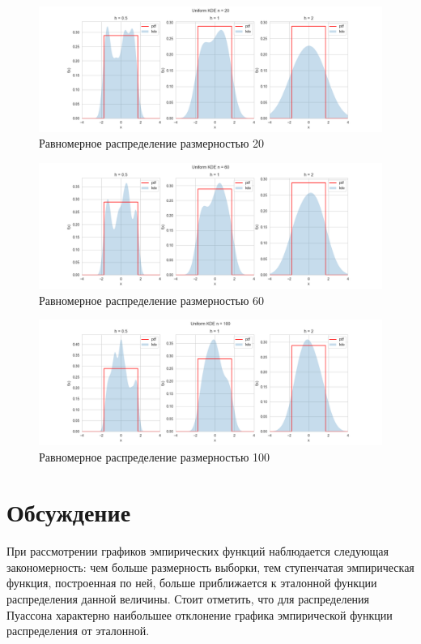 \documentclass[12pt,a4paper]{article}
\begin{document}
\begin{figure}[H]
    \centering
    \includegraphics[scale=0.5]{images/Uniform20.png}
    \caption{Равномерное распределение размерностью 20}
\end{figure}

\begin{figure}[H]
    \centering
    \includegraphics[scale=0.5]{images/Uniform60.png}
    \caption{Равномерное распределение размерностью 60}
\end{figure}

\begin{figure}[H]
    \centering
    \includegraphics[scale=0.5]{images/Uniform100.png}
    \caption{Равномерное распределение размерностью 100}
\end{figure}

\section{Обсуждение}
При рассмотрении графиков эмпирических функций наблюдается следующая закономерность: чем больше размерность выборки, тем ступенчатая эмпирическая функция, построенная по ней, больше приближается к эталонной функции распределения данной величины. Стоит отметить, что для распределения Пуассона характерно наибольшее отклонение графика эмпирической функции распределения от эталонной.
\end{document}
